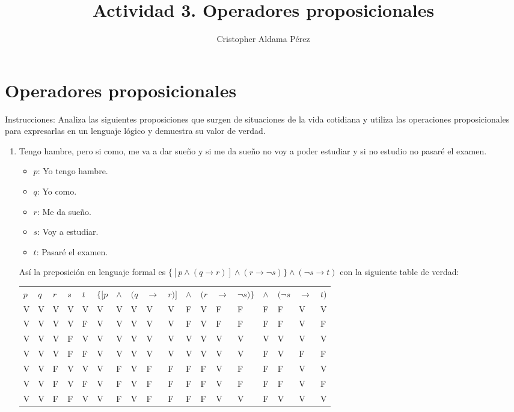 \documentclass[a4paper,10pt]{article}
\title{Actividad 3. Operadores proposicionales}
\author{Cristopher Aldama Pérez}
\begin{document}
\maketitle

\section{Operadores proposicionales}

Instrucciones: Analiza las siguientes proposiciones que surgen de situaciones de la vida cotidiana y utiliza las operaciones proposicionales para expresarlas en un lenguaje lógico y demuestra su valor de verdad. 

\begin{enumerate}
 \item Tengo hambre, pero si como, me va a dar sueño y si me da sueño no voy a poder estudiar y si no estudio no pasaré el examen.
\begin{itemize}
 \item \(p\): Yo tengo hambre.
 \item \(q\): Yo como.
 \item \(r\): Me da sueño.
 \item \(s\): Voy a estudiar.
 \item \(t\): Pasaré el examen.
\end{itemize}
Así la preposición en lenguaje formal es \( \{ [p \land (q \to r )] \land (r \to \neg s) \} \land (\neg s \to t) \) con la siguiente table de verdad:
\begin{center}
\begin{tabular}{llllllllllllllllll}
\(p\) & \(q\) & \(r\) & \(s\) & \(t\) & \(\{[p\) & \(\land\) & \((q\) & \(\to\) & \(r)]\) & \(\land\) & \((r\) & \(\to\) & \(\neg s)\}\) & \(\land\) & \((\neg s\) & \(\to\) & \(t)\) \\
V & V & V & V & V & V & V & V & V & V & F & V & F & F & F & F & V & V\\ 
V & V & V & V & F & V & V & V & V & V & F & V & F & F & F & F & V & F\\
V & V & V & F & V & V & V & V & V & V & V & V & V & V & V & V & V & V\\
V & V & V & F & F & V & V & V & V & V & V & V & V & V & F & V & F & F\\
V & V & F & V & V & V & F & V & F & F & F & F & V & F & F & F & V & V\\
V & V & F & V & F & V & F & V & F & F & F & F & V & F & F & F & V & F\\
V & V & F & F & V & V & F & V & F & F & F & F & V & V & F & V & V & V\\

\end{tabular}
\end{center}
\end{enumerate}
\end{document}

